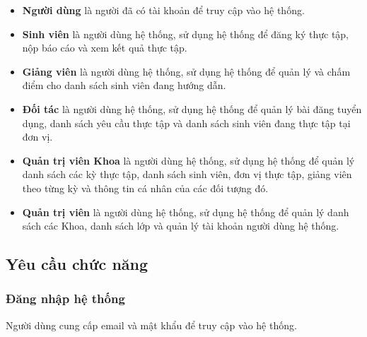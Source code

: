 \documentclass[./../main.tex]{subfiles}
\begin{document}
\begin{itemize}
	\item
	      
	      	\textbf{Người dùng} là người đã có tài khoản để truy cập vào hệ thống.
	      
	\item
	      
	      	\textbf{Sinh viên} là người dùng hệ thống, sử dụng hệ thống để đăng ký
	      	thực tập, nộp báo cáo và xem kết quả thực tập.
	      
	\item
	      
	      	\textbf{Giảng viên} là người dùng hệ thống, sử dụng hệ thống để quản
	      	lý và chấm điểm cho danh sách sinh viên đang hướng dẫn.
	      
	\item
	      
	      	\textbf{Đối tác} là người dùng hệ thống, sử dụng hệ thống để quản lý
	      	bài đăng tuyển dụng, danh sách yêu cầu thực tập và danh sách sinh viên
	      	đang thực tập tại đơn vị.
	      
	\item
	      
	      	\textbf{Quản trị viên Khoa} là người dùng hệ thống, sử dụng hệ thống
	      	để quản lý danh sách các kỳ thực tập, danh sách sinh viên, đơn vị thực
	      	tập, giảng viên theo từng kỳ và thông tin cá nhân của các đối tượng
	      	đó.
	      
	\item
	      
	      	\textbf{Quản trị viên} là người dùng hệ thống, sử dụng hệ thống để
	      	quản lý danh sách các Khoa, danh sách lớp và quản lý tài khoản người
	      	dùng hệ thống.
	      
\end{itemize}

\subsection{Yêu cầu chức năng}

\hypertarget{ux111ux103ng-nhux1eadp-hux1ec7-thux1ed1ng}{%
	\subsubsection{Đăng nhập hệ
		thống}\label{ux111ux103ng-nhux1eadp-hux1ec7-thux1ed1ng}}
  
Người dùng cung cấp email và mật khẩu để truy cập vào hệ thống.
  
\end{document}
